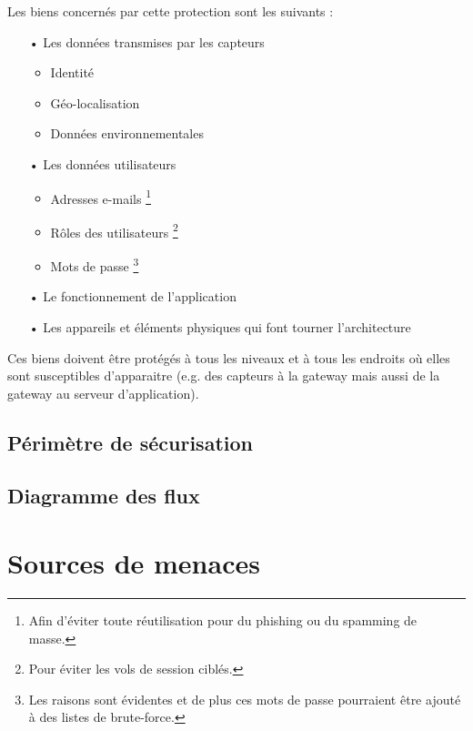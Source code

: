 \documentclass[12pt]{article}
\begin{document}
Les biens concernés par cette protection sont les suivants :

\begin{itemize}
\item[•] Les données transmises par les capteurs
\begin{itemize}
\item Identité
\item Géo-localisation
\item Données environnementales
\end{itemize}
\item[•] Les données utilisateurs
\begin{itemize}
\item Adresses e-mails \footnote{Afin d'éviter toute réutilisation pour du phishing ou du spamming de masse.}
\item Rôles des utilisateurs \footnote{Pour éviter les vols de session ciblés.}
\item Mots de passe \footnote{Les raisons sont évidentes et de plus ces mots de passe pourraient être ajouté à des listes de brute-force.}
\end{itemize}
\item[•] Le fonctionnement de l'application
\item[•] Les appareils et éléments physiques qui font tourner l'architecture
\end{itemize}

Ces biens doivent être protégés à tous les niveaux et à tous les endroits où elles sont susceptibles d'apparaitre (e.g. des capteurs à la gateway mais aussi de la gateway au serveur d'application).

\subsection{Périmètre de sécurisation}

\subsection{Diagramme des flux}

\section{Sources de menaces}
\end{document}
